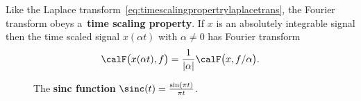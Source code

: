 \documentclass[11pt,a4paper]{book}
\theoremstyle{plain}
\numberwithin{equation}{section}
\newcommand{\term}{\textbf}
\newcommand{\abs}[1]{\left\vert #1 \right\vert}
\newcommand{\vtick}[1]{\draw (#1,-0.075) -- (#1,0.075) }
\newcommand{\htick}[1]{\draw (-0.075,#1) -- (0.075,#1)}
\begin{document}
Like the Laplace transform~\eqref{eq:timescalingpropertrylaplacetrans}, the Fourier transform obeys a~\term{time scaling property}.  If $x$ is an absolutely integrable signal then the time scaled signal $x(\alpha t)$ with $\alpha \neq 0$ has Fourier transform
\begin{equation}\label{eq:timescalingpropertryfouriertrans}
\calF\big( x(\alpha t), f \big) = \frac{1}{\abs{\alpha}} \calF\big( x , f/\alpha \big).
\end{equation}




\begin{figure}
\centering
{}
\caption{The \term{sinc function} $\sinc(t) = \frac{\sin(\pi t)}{\pi t}$.} \label{fig:sincfunction1}
\end{figure}
\end{document}
